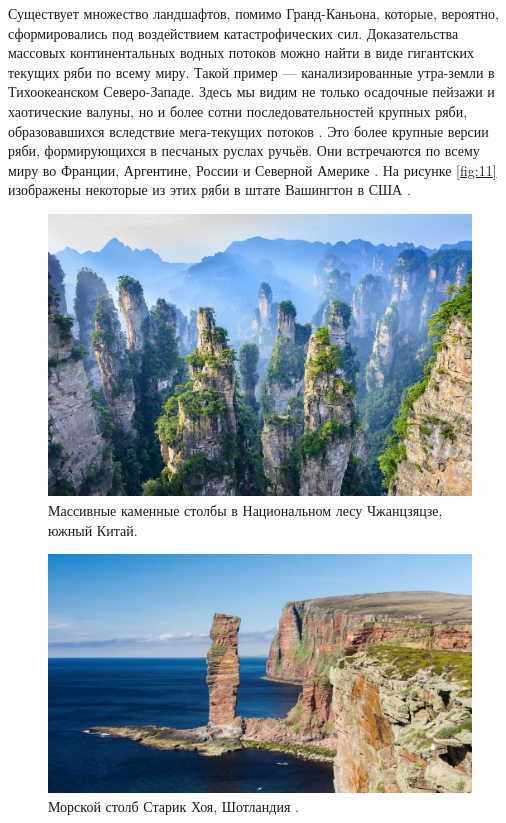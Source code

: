 \documentclass[10pt,twocolumn,letterpaper]{article}
\begin{document}
Существует множество ландшафтов, помимо Гранд-Каньона, которые, вероятно, сформировались под воздействием катастрофических сил. Доказательства массовых континентальных водных потоков можно найти в виде гигантских текущих ряби по всему миру. Такой пример — канализированные утра-земли в Тихоокеанском Северо-Западе. Здесь мы видим не только осадочные пейзажи и хаотические валуны, но и более сотни последовательностей крупных ряби, образовавшихся вследствие мега-текущих потоков \cite{78,79}. Это более крупные версии ряби, формирующихся в песчаных руслах ручьёв. Они встречаются по всему миру во Франции, Аргентине, России и Северной Америке \cite{81}. На рисунке \ref{fig:11} изображены некоторые из этих ряби в штате Вашингтон в США \cite{80}.

\begin{figure}[b]
\begin{center}
   \includegraphics[width=1\linewidth]{zhangjiajie.jpg}
\end{center}
   \caption{Массивные каменные столбы в Национальном лесу Чжанцзяцзе, южный Китай.}
\label{fig:12}
\label{fig:onecol}
\end{figure}

\begin{figure}[t]
\begin{center}
   \includegraphics[width=1\linewidth]{hoy.jpg}
\end{center}
   \caption{Морской столб Старик Хоя, Шотландия \cite{83}.}
\label{fig:13}
\label{fig:onecol}
\end{figure}
\end{document}
